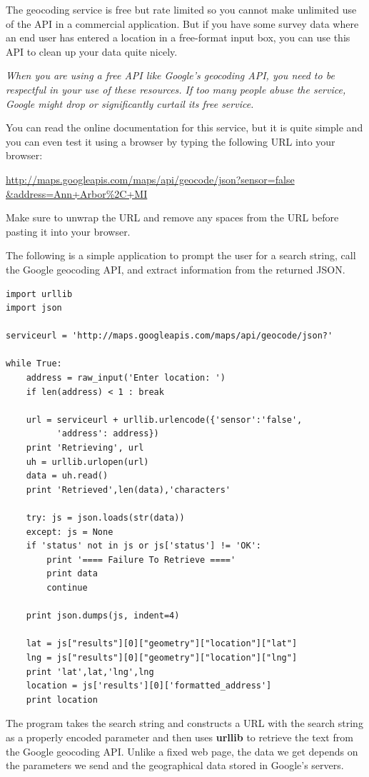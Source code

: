 The geocoding service is free but rate limited so you cannot make unlimited
use of the API in a commercial application.   But if you have some survey data
where an end user has entered a location in a free-format input box, you can use
this API to clean up your data quite nicely.  

{\em When you are using a free API like Google's geocoding API, you need
to be respectful in your use of these resources.  If too many people abuse the
service, Google might drop or significantly curtail its free service.}

You can read the online documentation for this service, but it is quite simple
and you can even test it using a browser by typing the following URL into your 
browser:

\url{http://maps.googleapis.com/maps/api/geocode/json?sensor=false &address=Ann+Arbor%2C+MI}

Make sure to unwrap the URL and remove any spaces from the URL before pasting
it into your browser.

The following is a simple application to prompt the user for a search string,
call the Google geocoding API, and extract information from the returned JSON.

\beforeverb
\begin{verbatim}
import urllib
import json

serviceurl = 'http://maps.googleapis.com/maps/api/geocode/json?'

while True:
    address = raw_input('Enter location: ')
    if len(address) < 1 : break

    url = serviceurl + urllib.urlencode({'sensor':'false', 
          'address': address})
    print 'Retrieving', url
    uh = urllib.urlopen(url)
    data = uh.read()
    print 'Retrieved',len(data),'characters'

    try: js = json.loads(str(data))
    except: js = None
    if 'status' not in js or js['status'] != 'OK':
        print '==== Failure To Retrieve ===='
        print data
        continue

    print json.dumps(js, indent=4)

    lat = js["results"][0]["geometry"]["location"]["lat"]
    lng = js["results"][0]["geometry"]["location"]["lng"]
    print 'lat',lat,'lng',lng
    location = js['results'][0]['formatted_address']
    print location
\end{verbatim}
\afterverb
%
The program takes the search string and constructs a URL with the
search string as a properly encoded parameter and then uses
{\bf urllib} to retrieve the text from the Google geocoding API.
Unlike a fixed web page, the data we get depends on the parameters
we send and the geographical data stored in Google's servers.

